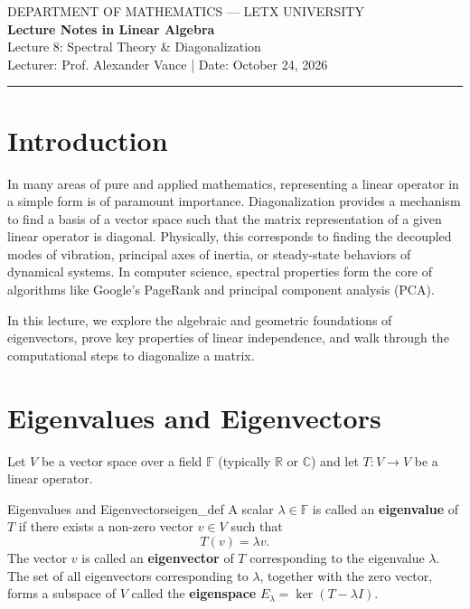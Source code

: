 \documentclass[10pt, letterpaper]{article}
\begin{document}
\thispagestyle{plain}

\begin{center}
    {\sffamily\color{muted}\uppercase{Department of Mathematics --- LetX University}} \\
    \vspace{0.4cm}
    {\sffamily\bfseries\Huge\color{thmcolor} Lecture Notes in Linear Algebra} \\
    \vspace{0.2cm}
    {\sffamily\Large\color{proofcolor} Lecture 8: Spectral Theory \& Diagonalization} \\
    \vspace{0.4cm}
    {\sffamily\large Lecturer: Prof. Alexander Vance \quad | \quad Date: October 24, 2026}
    \vspace{0.4cm}
    {\color{linecolor}\rule{\linewidth}{1.2pt}}
\end{center}
\vspace{0.5cm}

\section{Introduction}
In many areas of pure and applied mathematics, representing a linear operator in a simple form is of paramount importance. Diagonalization provides a mechanism to find a basis of a vector space such that the matrix representation of a given linear operator is diagonal. Physically, this corresponds to finding the decoupled modes of vibration, principal axes of inertia, or steady-state behaviors of dynamical systems. In computer science, spectral properties form the core of algorithms like Google's PageRank and principal component analysis (PCA).

In this lecture, we explore the algebraic and geometric foundations of eigenvectors, prove key properties of linear independence, and walk through the computational steps to diagonalize a matrix.

\section{Eigenvalues and Eigenvectors}
Let $V$ be a vector space over a field $\mathbb{F}$ (typically $\mathbb{R}$ or $\mathbb{C}$) and let $T: V \to V$ be a linear operator.

\begin{definition}{Eigenvalues and Eigenvectors}{eigen_def}
    A scalar $\lambda \in \mathbb{F}$ is called an \textbf{eigenvalue} of $T$ if there exists a non-zero vector $v \in V$ such that
    \begin{equation}
        T(v) = \lambda v.
    \end{equation}
    The vector $v$ is called an \textbf{eigenvector} of $T$ corresponding to the eigenvalue $\lambda$. The set of all eigenvectors corresponding to $\lambda$, together with the zero vector, forms a subspace of $V$ called the \textbf{eigenspace} $E_\lambda = \ker(T - \lambda I)$.
\end{definition}
\end{document}
